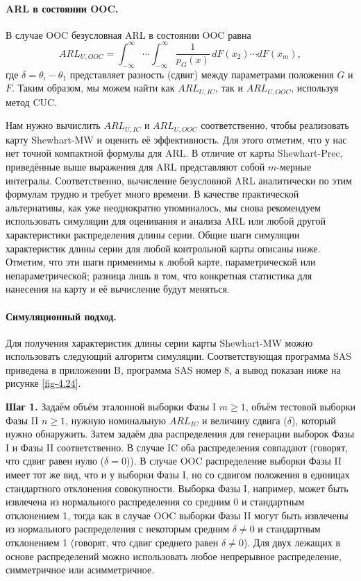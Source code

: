 \paragraph{ARL в состоянии OOC.} В случае OOC безусловная ARL в состоянии OOC равна
\begin{equation}
	ARL_{U, OOC} = \int_{-\infty}^{\infty}\cdots\int_{-\infty}^{\infty} \frac{1}{p_G(x)}\, dF(x_2)\cdots dF(x_m),
	\label{eq:4.51}
\end{equation}
где \(\delta = \theta_i - \theta_1\) представляет разность (сдвиг) между параметрами положения \(G\) и \(F\). Таким образом, мы можем найти как \(ARL_{U, IC}\), так и \(ARL_{U, OOC}\), используя метод CUC.

Нам нужно вычислить \(ARL_{U, IC}\) и \(ARL_{U, OOC}\) соответственно, чтобы реализовать карту Shewhart-MW и оценить её эффективность. Для этого отметим, что у нас нет точной компактной формулы для ARL. В отличие от карты Shewhart-Prec, приведённые выше выражения для ARL представляют собой \(m\)-мерные интегралы. Соответственно, вычисление безусловной ARL аналитически по этим формулам трудно и требует много времени. В качестве практической альтернативы, как уже неоднократно упоминалось, мы снова рекомендуем использовать симуляции для оценивания и анализа ARL или любой другой характеристики распределения длины серии. Общие шаги симуляции характеристик длины серии для любой контрольной карты описаны ниже. Отметим, что эти шаги применимы к любой карте, параметрической или непараметрической; разница лишь в том, что конкретная статистика для нанесения на карту и её вычисление будут меняться.

\paragraph{Симуляционный подход.} Для получения характеристик длины серии карты Shewhart-MW можно использовать следующий алгоритм симуляции. Соответствующая программа SAS приведена в приложении B, программа SAS номер 8, а вывод показан ниже на рисунке \ref{fig-4.24}.

\noindent\textbf{Шаг 1.} Задаём объём эталонной выборки Фазы I \(m \ge 1\), объём тестовой выборки Фазы II \(n \ge 1\), нужную номинальную \(ARL_{IC}\) и величину сдвига (\(\delta\)), который нужно обнаружить. Затем задаём два распределения для генерации выборок Фазы I и Фазы II соответственно. В случае IC оба распределения совпадают (говорят, что сдвиг равен нулю (\(\delta = 0\))). В случае OOC распределение выборки Фазы II имеет тот же вид, что и у выборки Фазы I, но со сдвигом положения в единицах стандартного отклонения совокупности. Выборка Фазы I, например, может быть извлечена из нормального распределения со средним 0 и стандартным отклонением 1, тогда как в случае OOC выборки Фазы II могут быть извлечены из нормального распределения с некоторым средним \(\delta \ne 0\) и стандартным отклонением 1 (говорят, что сдвиг среднего равен \(\delta \ne 0\)). Для двух лежащих в основе распределений можно использовать любое непрерывное распределение, симметричное или асимметричное.

